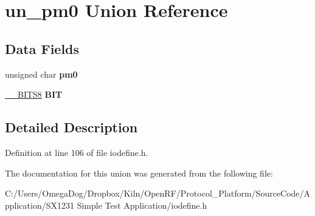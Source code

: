 \hypertarget{unionun__pm0}{\section{un\-\_\-pm0 Union Reference}
\label{unionun__pm0}
}
\subsection*{Data Fields}
\begin{DoxyCompactItemize}
\item 
\hypertarget{unionun__pm0_a77954eb7e79d428aee03d5ad79c2f047}{unsigned char {\bfseries pm0}}\label{unionun__pm0_a77954eb7e79d428aee03d5ad79c2f047}

\item 
\hypertarget{unionun__pm0_af40709f47649aa25738e168ca28f0cab}{\hyperlink{struct_____b_i_t_s8}{\-\_\-\-\_\-\-B\-I\-T\-S8} {\bfseries B\-I\-T}}\label{unionun__pm0_af40709f47649aa25738e168ca28f0cab}

\end{DoxyCompactItemize}


\subsection{Detailed Description}


Definition at line 106 of file iodefine.\-h.



The documentation for this union was generated from the following file\-:\begin{DoxyCompactItemize}
\item 
C\-:/\-Users/\-Omega\-Dog/\-Dropbox/\-Kiln/\-Open\-R\-F/\-Protocol\-\_\-\-Platform/\-Source\-Code/\-Application/\-S\-X1231 Simple Test Application/iodefine.\-h\end{DoxyCompactItemize}
